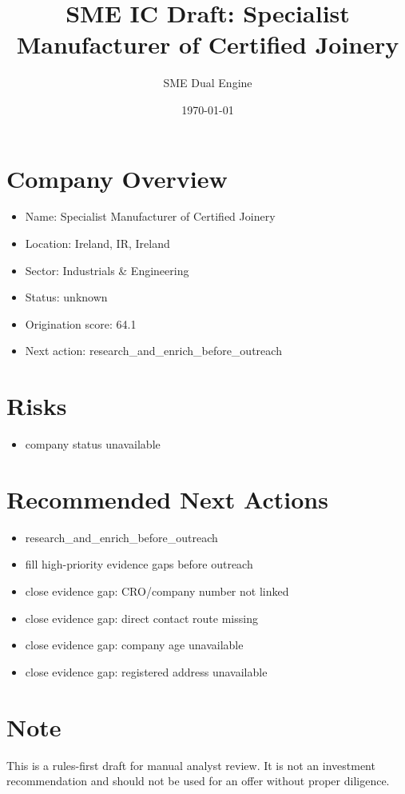 \documentclass[11pt,a4paper]{article}
\title{SME IC Draft: Specialist Manufacturer of Certified Joinery}
\author{SME Dual Engine}
\date{\today}
\begin{document}
\maketitle
\section*{Company Overview}
\begin{itemize}[leftmargin=1.4em]
\item Name: Specialist Manufacturer of Certified Joinery
\item Location: Ireland, IR, Ireland
\item Sector: Industrials \& Engineering
\item Status: unknown
\item Origination score: 64.1
\item Next action: research\_and\_enrich\_before\_outreach
\end{itemize}
\section*{Risks}
\begin{itemize}[leftmargin=1.4em]
\item company status unavailable
\end{itemize}
\section*{Recommended Next Actions}
\begin{itemize}[leftmargin=1.4em]
\item research\_and\_enrich\_before\_outreach
\item fill high-priority evidence gaps before outreach
\item close evidence gap: CRO/company number not linked
\item close evidence gap: direct contact route missing
\item close evidence gap: company age unavailable
\item close evidence gap: registered address unavailable
\end{itemize}
\section*{Note}
This is a rules-first draft for manual analyst review. It is not an investment
recommendation and should not be used for an offer without proper diligence.
\end{document}
